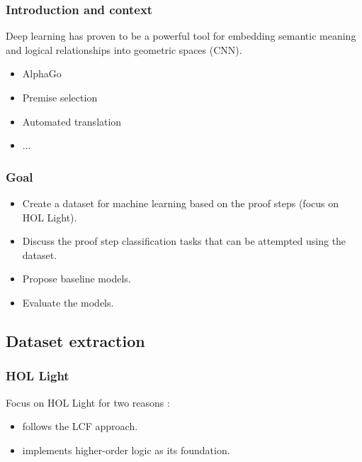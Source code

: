 \documentclass[11pt,handout]{beamer}
\begin{document}
\begin{frame}
  \frametitle{Introduction and context}
  Deep learning has proven to be a powerful tool for embedding semantic meaning
  and logical relationships into geometric spaces (CNN).
  \vspace*{1cm}
  \begin{itemize}
  \item AlphaGo
  \item Premise selection
  \item Automated translation
  \item ...
  \end{itemize}
\end{frame}

\begin{frame}
  \frametitle{Goal}
  \begin{itemize}
  \item Create a dataset for machine learning based on the proof steps (focus on
    HOL Light).
  \item Discuss the proof step classification tasks that can be attempted using the
    dataset.
  \item Propose baseline models.
  \item Evaluate the models.
  \end{itemize}
\end{frame}

\subsection[Dataset]{Dataset extraction}

\begin{frame}
  \frametitle{HOL Light}
  Focus on HOL Light for two reasons :
  \begin{itemize}
  \item follows the LCF approach.
  \item implements higher-order logic as its foundation.
  \end{itemize}

\end{frame}
\end{document}
